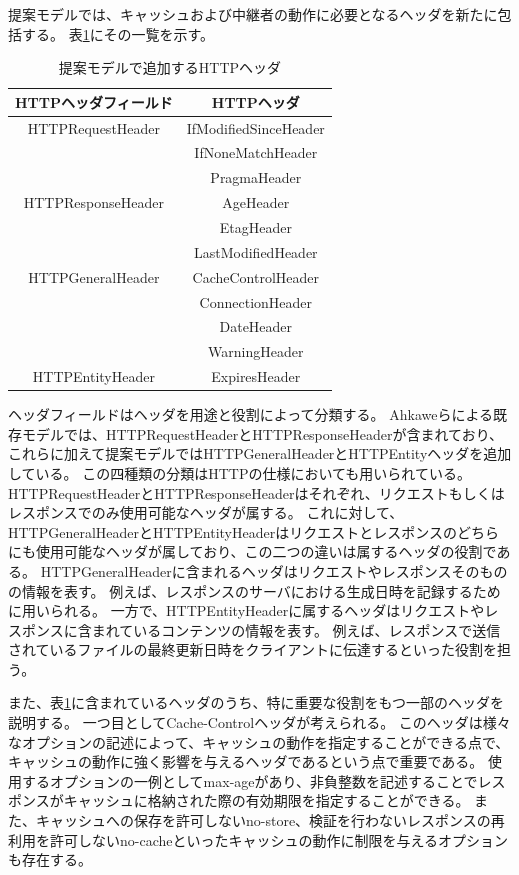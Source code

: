 \documentclass{css}
\begin{document}
提案モデルでは、キャッシュおよび中継者の動作に必要となるヘッダを新たに包括する。
表\ref{tb:model_header}にその一覧を示す。

\begin{table}[htb]
\centering
\caption{提案モデルで追加するHTTPヘッダ}
\label{tb:model_header}
\begin{tabular}{c|c}
\hline
HTTPヘッダフィールド & HTTPヘッダ \\ \hline \hline
HTTPRequestHeader & IfModifiedSinceHeader \\
 & IfNoneMatchHeader \\
 & PragmaHeader \\ \hline
HTTPResponseHeader & AgeHeader \\
　& EtagHeader \\
 & LastModifiedHeader \\ \hline
HTTPGeneralHeader & CacheControlHeader \\
 & ConnectionHeader \\
 & DateHeader \\
 & WarningHeader \\ \hline
HTTPEntityHeader & ExpiresHeader \\ \hline
\end{tabular}
\end{table}

ヘッダフィールドはヘッダを用途と役割によって分類する。
Ahkaweらによる既存モデル\cite{webmodel}では、HTTPRequestHeaderとHTTPResponseHeaderが含まれており、これらに加えて提案モデルではHTTPGeneralHeaderとHTTPEntityヘッダを追加している。
この四種類の分類はHTTPの仕様においても用いられている。
HTTPRequestHeaderとHTTPResponseHeaderはそれぞれ、リクエストもしくはレスポンスでのみ使用可能なヘッダが属する。
これに対して、HTTPGeneralHeaderとHTTPEntityHeaderはリクエストとレスポンスのどちらにも使用可能なヘッダが属しており、この二つの違いは属するヘッダの役割である。
HTTPGeneralHeaderに含まれるヘッダはリクエストやレスポンスそのものの情報を表す。
例えば、レスポンスのサーバにおける生成日時を記録するために用いられる。
一方で、HTTPEntityHeaderに属するヘッダはリクエストやレスポンスに含まれているコンテンツの情報を表す。
例えば、レスポンスで送信されているファイルの最終更新日時をクライアントに伝達するといった役割を担う。

また、表\ref{tb:model_header}に含まれているヘッダのうち、特に重要な役割をもつ一部のヘッダを説明する。
一つ目としてCache-Controlヘッダが考えられる。
このヘッダは様々なオプションの記述によって、キャッシュの動作を指定することができる点で、キャッシュの動作に強く影響を与えるヘッダであるという点で重要である。
使用するオプションの一例としてmax-ageがあり、非負整数を記述することでレスポンスがキャッシュに格納された際の有効期限を指定することができる。
また、キャッシュへの保存を許可しないno-store、検証を行わないレスポンスの再利用を許可しないno-cacheといったキャッシュの動作に制限を与えるオプションも存在する。
\end{document}
